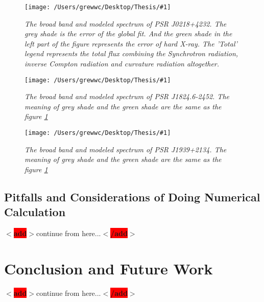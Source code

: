 \documentclass[12pt]{report}
\newcommand{\mycaption}[1]{\caption{\textit{\footnotesize #1}}}
\newcommand{\singleFig}[3]{
 \begin{figure}[!ht]
  \centering
  \texttt{[image: /Users/grewwc/Desktop/Thesis/\#1]}
  \mycaption{#3}
 \label{fig: #1}
 \end{figure}
 \vspace{0.5cm} 
}
\newcommand{\add}[1]{
  $<$\colorbox{red}{\textbf{add}}$>$#1$<$\colorbox{red}{\textbf{/add}}$>$
}
\begin{document}
        \singleFig{j0218_twolayer_all.png}{0.39}{The broad band and modeled spectrum of PSR J0218+4232.
          The grey shade is the error of the global fit. And the green shade in the left part of the 
          figure represents the error of hard X-ray. The 'Total' legend represents the total flux 
          combining the Synchrotron radiation, inverse Compton radiation and curvature radiation
          altogether.}
        \singleFig{b1821_twolayer_all.png}{0.4}{The broad band and modeled spectrum of PSR J1824.6-2452.
          The meaning of grey shade and the green shade are the same as the figure 
          \ref{fig: j0218_twolayer_all.png}}
        \singleFig{j1939_twolayer_all.png}{0.39}{The broad band and modeled spectrum of PSR J1939+2134.
          The meaning of grey shade and the green shade are the same as the figure 
          \ref{fig: j0218_twolayer_all.png}}
        
        \section{Pitfalls and Considerations of Doing Numerical Calculation}
          \add{continue from here...}

        
          


      \chapter{Conclusion and Future Work}
        \add{continue from here...}
\end{document}
